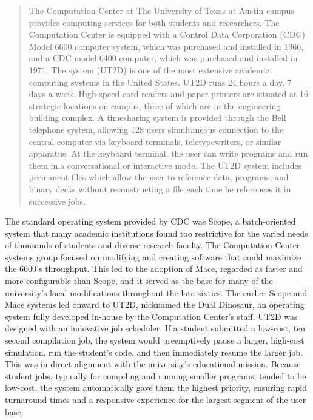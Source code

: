 \begin{quotation}
The Computation Center at The University of Texas at Austin campus provides computing services for both students and researchers. The Computation Center is equipped with a Control Data Corporation (CDC) Model 6600 computer system, which was purchased and installed in 1966, and a CDC model 6400 computer, which was purchased and installed in 1971. The system (UT2D) is one of the most extensive academic computing systems in the United States. UT2D runs 24 hours a day, 7 days a week. High-speed card readers and paper printers are situated at 16 strategic locations on campus, three of which are in the engineering building complex. A timesharing system is provided through the Bell telephone system, allowing 128 users simultaneous connection to the central computer via keyboard terminals, teletypewriters, or similar apparatus. At the keyboard terminal, the user can write programs and run them in.a conversational or interactive mode. The UT2D system includes permanent files which allow the user to reference data, programs, and binary decks without reconstructing a file each time he references it in successive jobs. \cite{derrSystem2000Data}
\end{quotation}

The standard operating system provided by CDC was Scope, a batch-oriented system that many academic institutions found too restrictive for the varied needs of thousands of students and diverse research faculty. The Computation Center systems group focused on modifying and creating software that could maximize the 6600’s throughput. This led to the adoption of Mace, regarded as faster and more configurable than Scope, and it served as the base for many of the university's local modifications throughout the late sixties. The earlier Scope and Mace systems led onward to UT2D, nicknamed the Dual Dinosaur, an operating system fully developed in-house by the Computation Center's staff. UT2D was designed with an innovative job scheduler. If a student submitted a low-cost, ten second compilation job, the system would preemptively pause a larger, high-cost simulation, run the student's code, and then immediately resume the larger job. This was in direct alignment with the university's educational mission. Because student jobs, typically for compiling and running smaller programs, tended to be low-cost, the system automatically gave them the highest priority, ensuring rapid turnaround times and a responsive experience for the largest segment of the user base. 

